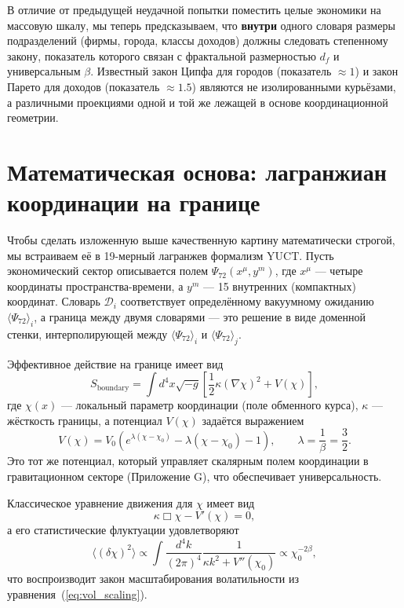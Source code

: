 \documentclass[12pt,a4paper]{article}
\theoremstyle{remark}
\begin{document}
	В отличие от предыдущей неудачной попытки поместить целые экономики на массовую шкалу, мы теперь предсказываем, что \textbf{внутри} одного словаря размеры подразделений (фирмы, города, классы доходов) должны следовать степенному закону, показатель которого связан с фрактальной размерностью \(d_f\) и универсальным \(\beta\). Известный закон Ципфа для городов (показатель \(\approx 1\)) и закон Парето для доходов (показатель \(\approx 1.5\)) являются не изолированными курьёзами, а различными проекциями одной и той же лежащей в основе координационной геометрии.
	
	\section{Математическая основа: лагранжиан координации на границе}
	
	Чтобы сделать изложенную выше качественную картину математически строгой, мы встраиваем её в 19-мерный лагранжев формализм YUCT. Пусть экономический сектор описывается полем \(\Psi_{72}(x^\mu, y^m)\), где \(x^\mu\) — четыре координаты пространства-времени, а \(y^m\) — 15 внутренних (компактных) координат. Словарь \(\mathcal{D}_i\) соответствует определённому вакуумному ожиданию \(\langle \Psi_{72} \rangle_i\), а граница между двумя словарями — это решение в виде доменной стенки, интерполирующей между \(\langle \Psi_{72} \rangle_i\) и \(\langle \Psi_{72} \rangle_j\).
	
	Эффективное действие на границе имеет вид
	\begin{equation}
		S_{\mathrm{boundary}} = \int d^4x \sqrt{-g} \left[ \frac{1}{2} \kappa (\nabla \chi)^2 + V(\chi) \right],
		\label{eq:action}
	\end{equation}
	где \(\chi(x)\) — локальный параметр координации (поле обменного курса), \(\kappa\) — жёсткость границы, а потенциал \(V(\chi)\) задаётся выражением
	\begin{equation}
		V(\chi) = V_0 \left( e^{\lambda(\chi - \chi_0)} - \lambda(\chi - \chi_0) - 1 \right), \qquad \lambda = \frac{1}{\beta} = \frac{3}{2}.
		\label{eq:potential}
	\end{equation}
	Это тот же потенциал, который управляет скалярным полем координации в гравитационном секторе (Приложение G), что обеспечивает универсальность.
	
	Классическое уравнение движения для \(\chi\) имеет вид
	\begin{equation}
		\kappa \Box \chi - V'(\chi) = 0,
		\label{eq:eom}
	\end{equation}
	а его статистические флуктуации удовлетворяют
	\begin{equation}
		\langle (\delta \chi)^2 \rangle \propto \int \frac{d^4k}{(2\pi)^4} \frac{1}{\kappa k^2 + V''(\chi_0)} \propto \chi_0^{-2\beta},
		\label{eq:fluctuations}
	\end{equation}
	что воспроизводит закон масштабирования волатильности из уравнения~(\ref{eq:vol_scaling}).
	
\end{document}
